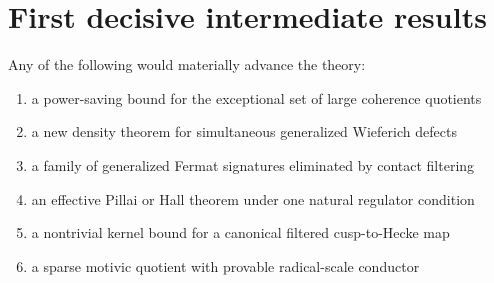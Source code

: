\section{First decisive intermediate results}
Any of the following would materially advance the theory:

\begin{enumerate}[leftmargin=1.5em]
\item a power-saving bound for the exceptional set of large coherence quotients
\item a new density theorem for simultaneous generalized Wieferich defects
\item a family of generalized Fermat signatures eliminated by contact filtering
\item an effective Pillai or Hall theorem under one natural regulator condition
\item a nontrivial kernel bound for a canonical filtered cusp-to-Hecke map
\item a sparse motivic quotient with provable radical-scale conductor
\end{enumerate}
